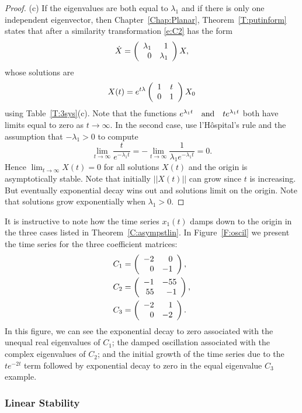 \documentclass{ximera}
\begin{document}
\begin{proof}
\noindent (c) \quad If the eigenvalues are both equal to $\lambda_1$
and if there is only one independent eigenvector, then
Chapter~\ref{Chap:Planar}, Theorem~\ref{T:putinform} states that after a
similarity transformation \eqref{e:C2} has the form
\[
\dot{X} = \left(\begin{array}{rr} \lambda_1 & 1\\ 0 &\lambda_1\end{array}\right)X,
\]
whose solutions are
\[
X(t) = e^{t\lambda}\left(\begin{array}{cc} 1 & t\\ 0 &1\end{array}\right) X_0
\]
using Table~\ref{T:3sys}(c). Note that the functions
$e^{\lambda_1 t} \quad\mbox{and}\quad te^{\lambda_1 t}$ both have limits equal to zero as
$t\to\infty$.  In the second case, use l'H\^{o}spital's rule and the
assumption that $-\lambda_1>0$ to compute
\[
\lim_{t\to\infty} \frac{t}{e^{-\lambda_1 t}} =
  -\lim_{t\to\infty} \frac{1}{\lambda_1 e^{-\lambda_1 t}} = 0.
\]
Hence $\lim_{t\to\infty} X(t) =0$ for all solutions $X(t)$ and the origin
is asymptotically stable.  Note that initially $||X(t)||$ can grow since
$t$ is increasing.  But eventually exponential decay wins out and solutions
limit on the origin.   Note that solutions grow exponentially when
$\lambda_1>0$.  \end{proof}

It is instructive to note how the time series $x_1(t)$ damps down to the
origin in the three cases listed in Theorem~\ref{C:asympstlin}.
In Figure~\ref{F:oscil} we present the time series for the three
coefficient matrices:
\begin{align*}
C_1 &= \left(\begin{array}{rr} -2 & 0\\ 0 &-1\end{array}\right), \\
C_2 &= \left(\begin{array}{rr} -1 & -55\\ 55 &-1\end{array}\right), \\
C_3 &= \left(\begin{array}{rr} -2 & 1\\ 0 &-2\end{array}\right).
\end{align*}
In this figure, we can see the exponential decay to zero associated with the
unequal real eigenvalues of $C_1$; the damped oscillation associated with the
complex eigenvalues of $C_2$; and the initial growth of the time series due
to the $te^{-2t}$ term followed by exponential decay to zero in the equal
eigenvalue $C_3$ example.

\begin{figure*}[htb]
           \centerline{%
	   }
           \caption{Time series for different sinks.}
           \label{F:oscil}
\end{figure*}


\subsubsection*{Linear Stability}
\end{document}
